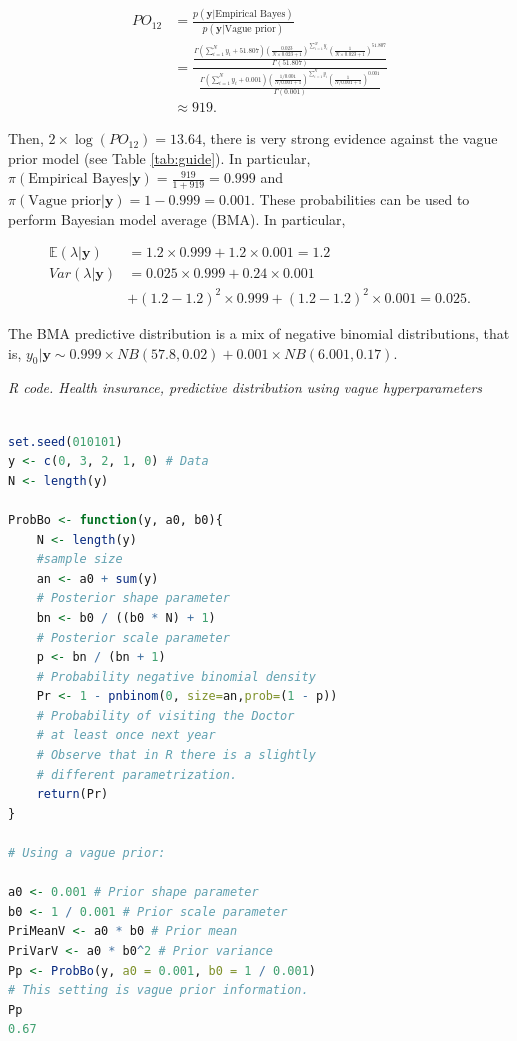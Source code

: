 \begin{align*}
	PO_{12}&=\frac{p(\mathbf{y}|\text{Empirical Bayes})}{p(\mathbf{y}|\text{Vague prior})}\\
	&=\frac{\frac{\Gamma(\sum_{i=1}^N y_i+51.807)\left(\frac{0.023}{N\times 0.023+1}\right)^{\sum_{i=1}^N y_i}\left(\frac{1}{N\times 0.023+1}\right)^{51.807}}{\Gamma(51.807)}}{\frac{\Gamma(\sum_{i=1}^N y_i+0.001)\left(\frac{1/0.001}{N/0.001+1}\right)^{\sum_{i=1}^N y_i}\left(\frac{1}{N/0.001+1}\right)^{0.001}}{\Gamma(0.001)}}\\
	&\approx 919.
\end{align*}

Then, $2\times \log(PO_{12})=13.64$, there is very strong evidence against the vague prior model (see Table \ref{tab:guide}). In particular, $\pi(\text{Empirical Bayes}|\mathbf{y})=\frac{919}{1+919}=0.999$ and $\pi(\text{Vague prior}|\mathbf{y})=1-0.999=0.001$. These probabilities can be used to perform Bayesian model average (BMA). In particular,

\begin{align*}
	\mathbb{E}(\lambda|\mathbf{y})&=1.2\times 0.999+1.2\times 0.001=1.2\\
	Var(\lambda|\mathbf{y})&=0.025\times 0.999+0.24\times 0.001\\
	& + (1.2-1.2)^2\times 0.999 + (1.2-1.2)^2\times 0.001= 0.025.
\end{align*}

The BMA predictive distribution is a mix of negative binomial distributions, that is, $y_0|\mathbf{y}\sim 0.999\times NB(57.8, 0.02)+0.001\times NB(6.001, 0.17)$.

\begin{tcolorbox}[enhanced,width=4.67in,center upper,
	fontupper=\large\bfseries,drop shadow southwest,sharp corners]
\textit{R code. Health insurance, predictive distribution using vague hyperparameters}
\begin{VF}
\begin{lstlisting}[basicstyle=\footnotesize, language=R]
	
set.seed(010101)
y <- c(0, 3, 2, 1, 0) # Data
N <- length(y)

ProbBo <- function(y, a0, b0){
	N <- length(y)
	#sample size
	an <- a0 + sum(y) 
	# Posterior shape parameter
	bn <- b0 / ((b0 * N) + 1) 
	# Posterior scale parameter
	p <- bn / (bn + 1) 
	# Probability negative binomial density
	Pr <- 1 - pnbinom(0, size=an,prob=(1 - p)) 
	# Probability of visiting the Doctor 
	# at least once next year
	# Observe that in R there is a slightly
	# different parametrization.
	return(Pr)
} 

# Using a vague prior:

a0 <- 0.001 # Prior shape parameter
b0 <- 1 / 0.001 # Prior scale parameter
PriMeanV <- a0 * b0 # Prior mean
PriVarV <- a0 * b0^2 # Prior variance
Pp <- ProbBo(y, a0 = 0.001, b0 = 1 / 0.001) 
# This setting is vague prior information.
Pp
0.67
\end{lstlisting}
\end{VF}
\end{tcolorbox} 

